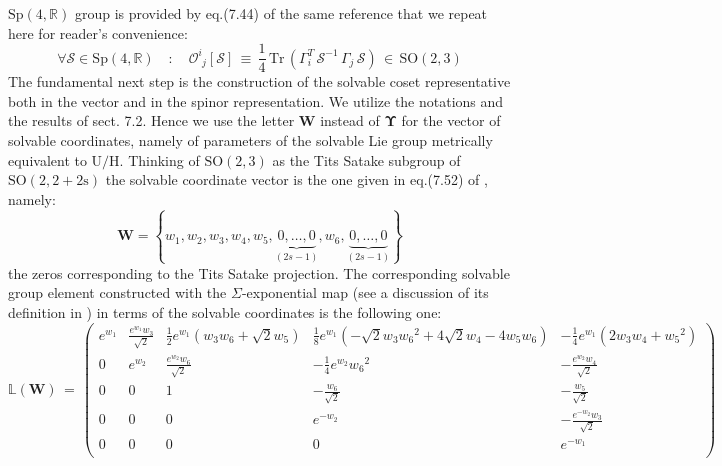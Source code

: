 \documentclass[10pt,a4paper]{article}
\newcommand{\ft}[2]{{\textstyle\frac{#1}{#2}}}
\begin{document}
$\mathrm{Sp(4,\mathbb{R})}$ group is provided by eq.(7.44) of the same reference   that we repeat here for reader's convenience:
\begin{equation}\label{cogrutto}
\forall \mathcal{S} \in \mathrm{Sp(4,\mathbb{R})} \quad : \quad    \mathcal{O}^i_{\phantom{i}j}[\mathcal{S}] \, \equiv \, \ft 14 \, \text{Tr} \, \left( \Gamma^T_{i} \, \mathcal{S}^{-1} \, \Gamma_j \, \mathcal{S}\right) \, \in \, \mathrm{SO(2,3)}
\end{equation}
The fundamental next step is the construction of the solvable coset representative both in the vector and in the spinor representation. We utilize the notations and the results of \cite{pgtstheory} sect. 7.2. Hence we use the letter \textbf{W} instead of $\boldsymbol{\Upsilon}$ for the vector of solvable coordinates, namely of parameters of the solvable Lie group metrically equivalent to $\mathrm{U/H}$. Thinking of $\mathrm{SO(2,3)}$ as the Tits Satake subgroup of $\mathrm{SO(2,2+2s)}$ the solvable coordinate vector is the one given in eq.(7.52) of \cite{pgtstheory}, namely:
\begin{equation}\label{craniato}
  \boldsymbol{W}=\left\{w_1,w_2,w_3,w_4,w_5,\underbrace{0,\dots,0}_{(2s-1)},w_6,\underbrace{0,\dots,0}_{(2s-1)}\right\}
\end{equation}
the zeros  corresponding to the Tits Satake projection. The corresponding solvable group element constructed with the $\Sigma$-exponential map (see a discussion of its definition in \cite{TSnaviga}) in terms of the solvable coordinates is the following one:
\begin{equation}\label{LBmat}
  \mathbb{L}\left(\mathbf{W}\right)\, =\, \left(
\begin{array}{ccccc}
 e^{ {w_1}} & \frac{e^{ {w_1}}  {w_3}}{\sqrt{2}} & \frac{1}{2}
   e^{ {w_1}} \left( {w_3}  {w_6}+\sqrt{2}  {w_5}\right) &
   \frac{1}{8} e^{ {w_1}} \left(-\sqrt{2}  {w_3}  {w_6}^2+4 \sqrt{2}
    {w_4}-4  {w_5}  {w_6}\right) & -\frac{1}{4} e^{ {w_1}} \left(2
    {w_3}  {w_4}+ {w_5}^2\right) \\
 0 & e^{ {w_2}} & \frac{e^{ {w_2}}  {w_6}}{\sqrt{2}} & -\frac{1}{4}
   e^{ {w_2}}  {w_6}^2 & -\frac{e^{ {w_2}}  {w_4}}{\sqrt{2}} \\
 0 & 0 & 1 & -\frac{ {w_6}}{\sqrt{2}} & -\frac{ {w_5}}{\sqrt{2}} \\
 0 & 0 & 0 & e^{- {w_2}} & -\frac{e^{- {w_2}}  {w_3}}{\sqrt{2}} \\
 0 & 0 & 0 & 0 & e^{- {w_1}} \\
\end{array}
\right)
\end{equation}
\end{document}
